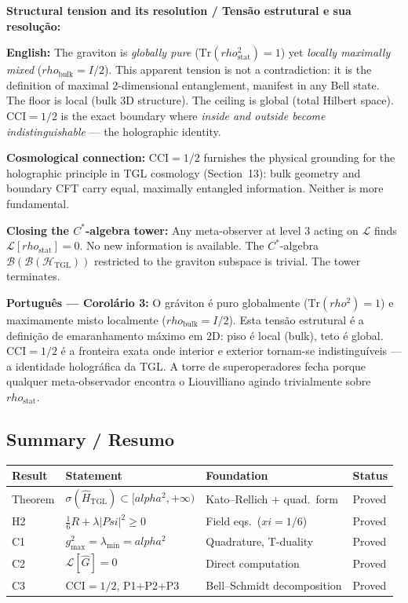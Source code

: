 \documentclass[12pt,a4paper]{article}
\def\Psi{Psi}%
\def\alpha{alpha}%
\def\xi{xi}%
\def\rho{rho}%
\begin{document}
\textbf{Structural tension and its resolution / Tensão estrutural e sua resolução:}

\textbf{English:} The graviton is \emph{globally pure} ($\mathrm{Tr}(\rho_{\mathrm{stat}}^2) = 1$) yet \emph{locally maximally mixed} ($\rho_{\mathrm{bulk}} = I/2$). This apparent tension is not a contradiction: it is the definition of maximal 2-dimensional entanglement, manifest in any Bell state. The floor is local (bulk 3D structure). The ceiling is global (total Hilbert space). $\mathrm{CCI} = 1/2$ is the exact boundary where \emph{inside and outside become indistinguishable} --- the holographic identity.

\textbf{Cosmological connection:} $\mathrm{CCI} = 1/2$ furnishes the physical grounding for the holographic principle in TGL cosmology (Section~13): bulk geometry and boundary CFT carry equal, maximally entangled information. Neither is more fundamental.

\textbf{Closing the $C^*$-algebra tower:} Any meta-observer at level 3 acting on $\mathcal{L}$ finds $\mathcal{L}[\rho_{\mathrm{stat}}] = 0$. No new information is available. The $C^*$-algebra $\mathcal{B}(\mathcal{B}(\mathcal{H}_{\text{TGL}}))$ restricted to the graviton subspace is trivial. The tower terminates.

\textbf{Português --- Corolário 3:} O gráviton é puro globalmente ($\mathrm{Tr}(\rho^2)=1$) e maximamente misto localmente ($\rho_{\text{bulk}}=I/2$). Esta tensão estrutural é a definição de emaranhamento máximo em 2D: piso é local (bulk), teto é global. $\mathrm{CCI}=1/2$ é a fronteira exata onde interior e exterior tornam-se indistinguíveis --- a identidade holográfica da TGL. A torre de superoperadores fecha porque qualquer meta-observador encontra o Liouvilliano agindo trivialmente sobre $\rho_{\text{stat}}$.

\subsection{Summary / Resumo}

\begin{center}
\renewcommand{\arraystretch}{1.3}
\begin{tabular}{llll}
\toprule
Result & Statement & Foundation & Status \\
\midrule
Theorem  & $\sigma(\hat{H}_{\text{TGL}}) \subset [\alpha^2,+\infty)$ & Kato--Rellich + quad.\ form & Proved \\
H2       & $\tfrac{1}{6}R + \lambda|\Psi|^2 \geq 0$ & Field eqs.\ ($\xi=1/6$)     & Proved \\
C1       & $g_{\max}^2 = \lambda_{\min} = \alpha^2$  & Quadrature, T-duality        & Proved \\
C2       & $\mathcal{L}[\hat{G}] = 0$                & Direct computation           & Proved \\
C3       & $\mathrm{CCI}=1/2$,\; P1+P2+P3           & Bell--Schmidt decomposition  & Proved \\
\bottomrule
\end{tabular}
\end{center}
\end{document}
